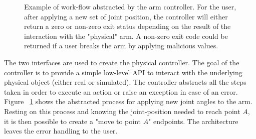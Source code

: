 \begin{figure}


\centering
{}

\caption[Overview of a controller work-flow]{Example of work-flow abstracted by the arm controller. For the user, after applying a new set of joint position, the controller will either return a zero or non-zero exit status depending on the result of the interaction with the "physical" arm. A non-zero exit code could be returned if a user breaks the arm by applying malicious values.}
\label{fig:ros-controller-process}
\end{figure}


The two interfaces are used to create the physical controller. The goal of the controller is to provide a simple low-level API to interact with the underlying physical object (either real or simulated). The controller abstracts all the steps taken in order to execute an action or raise an exception in case of an error. Figure ~\ref{fig:ros-controller-process} shows the abstracted process for applying new joint angles to the arm. Resting on this process and knowing the joint-position needed to reach point $A$, it is then possible to create a "move to point $A$" endpoints. The architecture leaves the error handling to the user. 

